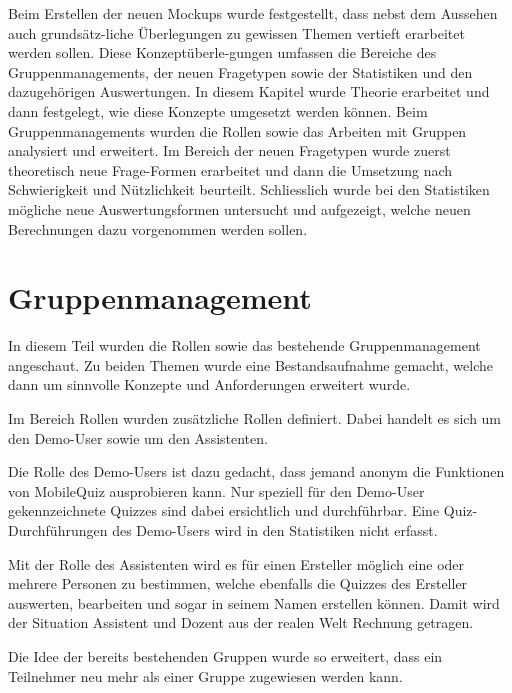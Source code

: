 


Beim Erstellen der neuen Mockups wurde festgestellt, dass nebst dem Aussehen auch grundsätz-liche Überlegungen zu gewissen Themen vertieft erarbeitet werden sollen. Diese Konzeptüberle-gungen umfassen die Bereiche des Gruppenmanagements, der neuen Fragetypen sowie der Statistiken und den dazugehörigen Auswertungen.
In diesem Kapitel wurde Theorie erarbeitet und dann festgelegt, wie diese Konzepte umgesetzt werden können. Beim Gruppenmanagements wurden die Rollen sowie das Arbeiten mit Gruppen analysiert und erweitert. Im Bereich der neuen Fragetypen wurde zuerst theoretisch neue Frage-Formen erarbeitet und dann die Umsetzung nach Schwierigkeit und Nützlichkeit beurteilt. Schliesslich wurde bei den Statistiken mögliche neue Auswertungsformen untersucht und aufgezeigt, welche neuen Berechnungen dazu vorgenommen werden sollen.

\section{Gruppenmanagement}
In diesem Teil wurden die Rollen sowie das bestehende Gruppenmanagement angeschaut. Zu beiden Themen wurde eine Bestandsaufnahme gemacht, welche dann um sinnvolle Konzepte und Anforderungen erweitert wurde.

\bigskip

Im Bereich Rollen wurden zusätzliche Rollen definiert. Dabei handelt es sich um den Demo-User sowie um den Assistenten.

Die Rolle des Demo-Users ist dazu gedacht, dass jemand anonym die Funktionen von MobileQuiz ausprobieren kann. Nur speziell für den Demo-User gekennzeichnete Quizzes sind dabei ersichtlich und durchführbar. Eine Quiz-Durchführungen des Demo-Users wird in den Statistiken nicht erfasst.

Mit der Rolle des Assistenten wird es für einen Ersteller möglich eine oder mehrere Personen zu bestimmen, welche ebenfalls die Quizzes des Ersteller auswerten, bearbeiten und sogar in seinem Namen erstellen können. Damit wird der Situation Assistent und Dozent aus der realen Welt Rechnung getragen.

\bigskip

Die Idee der bereits bestehenden Gruppen wurde so erweitert, dass ein Teilnehmer neu mehr als einer Gruppe zugewiesen werden kann.

